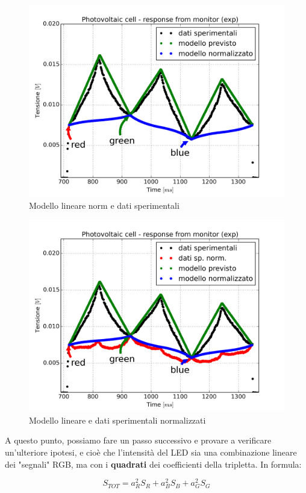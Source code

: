 \documentclass[journal, a4paper]{IEEEtran}
\begin{document}
\begin{figure}
\centering
\includegraphics[width=0.8\linewidth]{./relaz_colori/4_315_modello_lin+mod_norm}
\caption{Modello lineare norm e dati sperimentali}
\label{fig:4_315_modello_lin+mod_norm}
\end{figure}


\begin{figure}
\centering
\includegraphics[width=0.8\linewidth]{./relaz_colori/5_315_modello_lin_mod_norm_datanorm}
\caption{Modello lineare e dati sperimentali normalizzati}
\label{fig:5_315_modello_lin_mod_norm_datanorm}
\end{figure}


A questo punto, possiamo fare un passo successivo e provare a verificare un'ulteriore ipotesi, e cioè che l'intensità del LED sia una combinazione lineare dei "segnali" RGB, ma con i \textbf{quadrati} dei coefficienti della tripletta. In formula:

\begin{equation}\label{sig_quad}
S_{TOT} = a_R^2 S_R + a_B^2 S_B + a_G^2 S_G
\end{equation}
\end{document}

